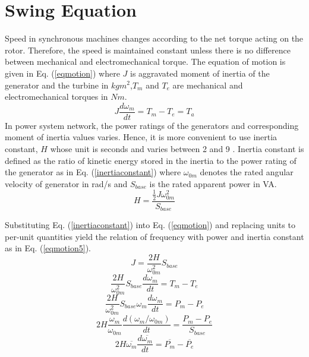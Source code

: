 \section{Swing Equation}
\label{swing}
Speed in synchronous machines changes according to the net torque acting on the rotor. Therefore, the speed is maintained constant unless there is no difference between mechanical and electromechanical torque. The equation of motion is given in Eq. (\ref{eqmotion}) where $J$ is aggravated moment of inertia of the generator and the turbine in $kgm^{2}$,$T_{m}$ and $T_{e}$ are mechanical and electromechanical torques in $Nm$.
\begin{equation}
J\frac{d\omega_{m}}{dt}=T_{m}-T_{e}=T_{a}
\label{eqmotion}
\end{equation}
In power system network, the power ratings of the generators and corresponding moment of inertia values varies. Hence, it is more convenient to use inertia constant, $H$ whose unit is seconds and varies between 2 and 9 \cite{Kundur}. Inertia constant is defined as the ratio of kinetic energy stored in the inertia to the power rating of the generator as in Eq. (\ref{inertiaconstant}) where $\omega_{0m}$ denotes the rated angular velocity of generator in rad/s and $S_{base}$ is the rated apparent power in VA. 
\begin{equation}
H=\frac{{\frac{1}{2}}J\omega_{0m}^{2}}{S_{base}}
\label{inertiaconstant}
\end{equation}

Substituting Eq. (\ref{inertiaconstant}) into Eq. (\ref{eqmotion}) and replacing units to per-unit quantities yield the relation of frequency with power and inertia constant as in Eq. (\ref{eqmotion5}).
\begin{equation}
J=\frac{2H}{\omega_{0m}^{2}}{S_{base}}
\label{inertiaconstant2}
\end{equation}
\begin{equation}
\frac{2H}{\omega_{0m}^{2}}{S_{base}}\frac{d\omega_{m}}{dt}=T_{m}-T_{e}
\label{eqmotion2}
\end{equation}
\begin{equation}
\frac{2H}{\omega_{0m}^{2}}{S_{base}\omega_{m}}\frac{d\omega_{m}}{dt}=P_{m}-P_{e}
\label{eqmotion3}
\end{equation}
\begin{equation}
2H\frac{\omega_{m}}{\omega_{0m}}\frac{d(\omega_{m}/\omega_{0m})}{dt}=\frac{P_{m}-P_{e}}{S_{base}}
\label{eqmotion4}
\end{equation}
\begin{equation}
2H\overline{\omega_{m}}\frac{d\overline{\omega_{m}}}{dt}=\overline{P_{m}}-\overline{P_{e}}
\label{eqmotion5}
\end{equation}
